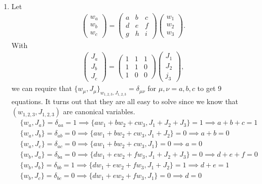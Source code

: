 \documentclass{article}
\theoremstyle{definition}
\newcommand{\w}{\omega}
\begin{document}
\begin{enumerate}[label=(\alph*)]
	\item Let 
	\begin{align*}
	\begin{pmatrix}
	w_a \\ w_b \\ w_c
	\end{pmatrix}
	= \begin{pmatrix}
	a&b&c\\d&e&f\\g&h&i
	\end{pmatrix}
	\begin{pmatrix}
	w_1\\w_2\\w_3
	\end{pmatrix}.
	\end{align*}
	With 
	\begin{align*}
	\begin{pmatrix}
	J_a \\ J_b \\ J_c
	\end{pmatrix}
	= \begin{pmatrix}
	1&1&1\\1&1&0\\1&0&0
	\end{pmatrix}
	\begin{pmatrix}
	J_1\\J_2\\j_3
	\end{pmatrix},
	\end{align*}
	we can require that $\{ w_\mu, J_\mu \}_{w_{1,2,3},J_{1,2,3}} = \delta_{\mu\nu}$ for $\mu,\nu = a,b,c$ to get 9 equations. It turns out that they are all easy to solve since we know that $(w_{1,2,3}, J_{1,2,3})$ are canonical variables.
	\begin{align*}
	&\{w_a, J_a\} = \delta_{aa} = 1 \implies \{aw_1+ bw_2 + cw_3 , J_1+J_2+J_3\} = 1 \implies a+b+c = 1\\
	&\{w_a, J_b\} = \delta_{ab} = 0 \implies \{aw_1+ bw_2 + cw_3 , J_1+J_2\} = 0 \implies a+b = 0\\
	&\{w_a, J_c\} = \delta_{ac} = 0 \implies \{aw_1+ bw_2 + cw_3 , J_1\} = 0 \implies a = 0\\
	&\{w_b, J_a\} = \delta_{ba} = 0 \implies \{dw_1+ ew_2 + fw_3 , J_1+J_2+J_3\} = 0 \implies d+e+f = 0\\
	&\{w_b, J_b\} = \delta_{bb} = 1 \implies \{dw_1+ ew_2 + fw_3 , J_1+J_2\} = 1 \implies d+e = 1\\
	&\{w_b, J_c\} = \delta_{bc} = 0 \implies \{dw_1+ ew_2 + fw_3 , J_1\} = 0 \implies d = 0\\

\end{align*}
\end{enumerate}
\end{document}
